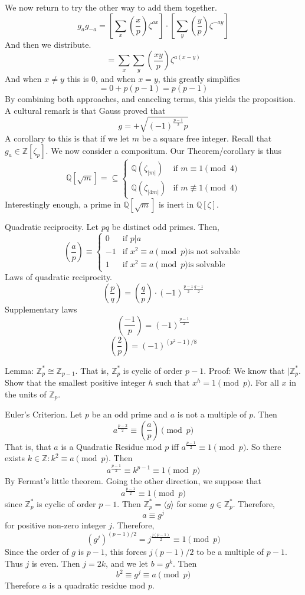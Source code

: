 \documentclass{article}
\begin{document}
We now return to try the other way to add them together. 
\[ g_a g_{-a} = \left[ \sum_x \left(\frac{x}{p}\right)\zeta^{ax} \right] \cdot
\left[ \sum_y \left(\frac{y}{p}\right) \zeta^{-ay} \right] \]
And then we distribute. 
\[ = \sum_x \sum_y \left(\frac{xy}{p}\right) \zeta^{a(x - y)} \]
And when $x \neq y$ this is 0, and when $x = y$, this greatly simplifies
\[ = 0 + p(p-1) = p(p-1) \]
By combining both approaches, and canceling terms, this yields the proposition.
A cultural remark is that Gauss proved that
\[ g = + \sqrt{(-1)^{\frac{p-1}{2}} p } \]
A corollary to this is that if we let $m$ be a square free integer. Recall that
$g_a \in \mathbb{Z}[\zeta_p]$. We now consider a compositum. Our
Theorem/corollary is thus
\[ \mathbb{Q}[\sqrt{m}] = \subseteq \begin{cases} 
\mathbb{Q}(\zeta_{|m|}) &\text{if } m\equiv 1 \pmod{4} \\
\mathbb{Q}(\zeta_{|4m|}) &\text{if } m \not\equiv 1 \pmod{4}\end{cases} \]
Interestingly enough, a prime in $\mathbb{Q}[\sqrt{m}]$ is inert in
$\mathbb{Q}[\zeta]$.

Quadratic reciprocity. Let $pq$ be distinct odd primes. Then,
\[ \left(\frac{a}{p}\right) \equiv \begin{cases} 0 &\text{if } p | a\\
-1 &\text{if } x^2 \equiv a \pmod{p} \text{is not solvable}\\
1 &\text{if }  x^2 \equiv a\pmod{p} \text{is solvable} \end{cases} \]
Laws of quadratic reciprocity.
\[ \left(\frac{p}{q}\right) =
\left(\frac{q}{p}\right)\cdot(-1)^{\frac{p-1}{2}\frac{q-1}{2}} \]
Supplementary laws
\[ \left(\frac{-1}{p}\right) = (-1)^{\frac{p-1}{2}} \]
\[ \left(\frac{2}{p}\right) = (-1)^{(p^2-1)/8} \]

Lemma: $\mathbb{Z}_p^* \cong \mathbb{Z}_{p-1}$. That is, $\mathbb{Z}_p^*$ is
cyclic of order $p-1$. Proof: We know that $|\mathbb{Z}_p^*$. Show that the
smallest positive integer $h$ such that $x^h = 1\pmod{p}$. For all $x$ in the
units of $\mathbb{Z}_p$. 

Euler's Criterion. Let $p$ be an odd prime and $a$ is not a multiple of $p$.
Then
\[ a^{\frac{p-2}{2}} \equiv \left(\frac{a}{p}\right) \pmod{p} \]
That is, that $a$ is a Quadratic Residue mod $p$ iff $a^{\frac{p-1}{2}} \equiv 1
\pmod{p}$. So there exists $k\in \mathbb{Z}: k^2 \equiv a \pmod{p}$. Then
\[ a^{\frac{p-1}{2}} \equiv k^{p-1} \equiv 1 \pmod{p} \]
By Fermat's little theorem. Going the other direction, we suppose that 
\[ a^{\frac{p-1}{2}} \equiv 1 \pmod{p} \]
since $\mathbb{Z}_p^*$ is cyclic of order $p-1$. Then $\mathbb{Z}_p^* = \langle
g \rangle $ for some $g \in \mathbb{Z}_p^*$. Therefore, 
\[ a \equiv g^j \]
for positive non-zero integer $j$. Therefore, 
\[ (g^j)^{(p-1)/2} = j^{\frac{j(p-1)}{2}} \equiv 1 \pmod{p} \]
Since the order of $g$ is $p-1$, this forces $j(p-1)/2$ to be a multiple of
$p-1$. Thus $j$ is even. Then $j = 2k$, and we let $b = g^k$. Then
\[ b^2 \equiv g^j \equiv a \pmod{p} \]
Therefore
$a$ is a quadratic residue mod $p$. 
\end{document}
